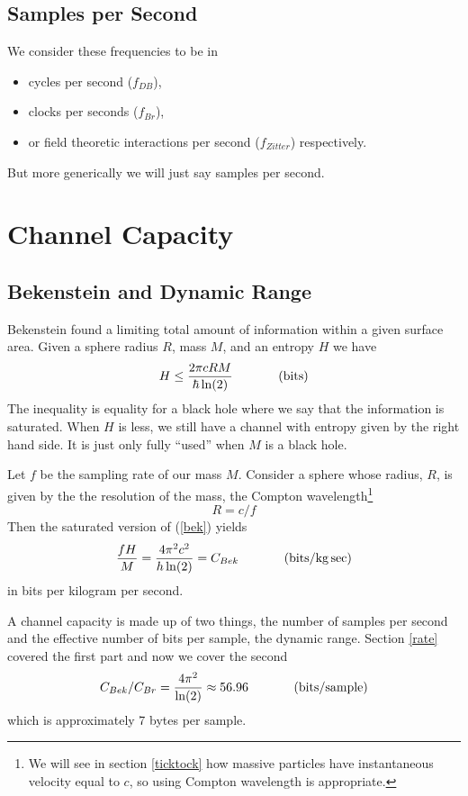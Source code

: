 \documentclass[12pt,a4paper]{article}
\begin{document}
\subsection{Samples per Second}
We consider these frequencies to be in
\begin{itemize}
 \item cycles per second ($f_{DB}$),
 \item clocks per seconds ($f_{Br}$),
 \item or field theoretic interactions per second ($f_{Zitter}$) respectively.
\end{itemize}
But more generically we will just say samples per second. 

\section{Channel Capacity}
\subsection{Bekenstein and Dynamic Range}
Bekenstein found a limiting total amount of information within a given surface area.  Given a sphere radius $R$,  mass $M$, and an entropy $H$ we have
\begin{equation}
\label{bek}
  H \le \frac{2 \pi c R M}{\hbar \ln(2)} \hspace{0.5 in} (\si[per-mode=symbol]{bits})
\end{equation}
The inequality is equality for a black hole where we say that the information is saturated.  When $H$ is less, we still have a channel with entropy given by the right hand side.  It is just only fully ``used'' when $M$ is a black hole.

Let $f$ be the sampling rate of our mass $M$.  Consider a sphere whose radius, $R$, is given by the  the resolution of the mass, the Compton wavelength\footnote{We will see in section \ref{ticktock} how massive particles have instantaneous velocity equal to $c$, so using Compton wavelength is appropriate.}
\[
  R=c/f  
\]
Then the saturated version of (\ref{bek}) yields
\[
 \frac{fH}{M} = \frac{4 \pi^2 c^2}{h \ln(2)} = C_{Bek} \hspace{0.5 in} (\si[per-mode=symbol]{bits\per\kilogram.\sec})
\]
in bits per kilogram per second.

A channel capacity is made up of two things, the number of samples per second and the effective number of bits per sample, the dynamic range.  Section \ref{rate} covered the first part and now we cover the second
\begin{equation}
\label{cap}
   C_{Bek} / C_{Br} = \frac{4 \pi^2}{\ln(2)} \approx 56.96 \hspace{0.5 in} (\si[per-mode=symbol]{bits\per sample})
\end{equation}
which is approximately 7 bytes per sample. 
\end{document}
